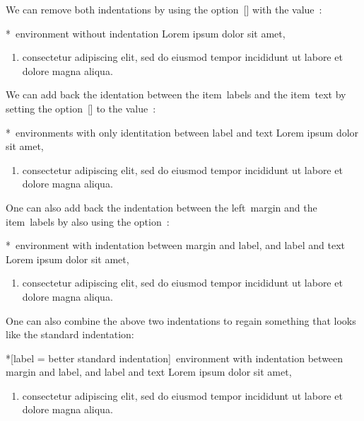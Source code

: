 We can remove both indentations by using the option~[\optname] with the value~\optname{0pt}:
\begin{showlatex}*{~environment without  indentation}
Lorem ipsum dolor sit amet,
\begin{enumerate}[wide = 0pt]
  \item
  consectetur adipiscing elit, sed do eiusmod tempor incididunt ut labore et dolore magna aliqua.
\end{enumerate}
\end{showlatex}
We can add back the identation between the item~labels and the item~text by setting the option~[\optname] to the value~\optname{*}:
\begin{showlatex}*{~environments with only identitation between label and text}
Lorem ipsum dolor sit amet,
\begin{enumerate}[wide = 0pt, leftmargin = *]
  \item
  consectetur adipiscing elit, sed do eiusmod tempor incididunt ut labore et dolore magna aliqua.
\end{enumerate}
\end{showlatex}
One can also add back the indentation between the left~margin and the item~labels by also using the option~:
\begin{showlatex}*{~environment with indentation between margin and label, and label and text}
Lorem ipsum dolor sit amet,
\begin{enumerate}[wide = 0pt, leftmargin = \parindent, labelindent = \parindent]
  \item
  consectetur adipiscing elit, sed do eiusmod tempor incididunt ut labore et dolore magna aliqua.
\end{enumerate}
\end{showlatex}
One can also combine the above two indentations to regain something that looks like the standard indentation:
\begin{showlatex}*[label = {better standard indentation}]{~environment with indentation between margin and label, and label and text}
Lorem ipsum dolor sit amet,
\begin{enumerate}[wide = 0pt, leftmargin = *, labelindent = \parindent]
  \item
  consectetur adipiscing elit, sed do eiusmod tempor incididunt ut labore et dolore magna aliqua.
\end{enumerate}
\end{showlatex}
